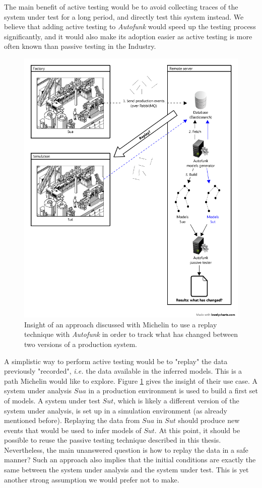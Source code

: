 The main benefit of active testing would be to avoid collecting
traces of the system under test for a long period, and directly
test this system instead. We believe that adding active testing
to \textit{Autofunk} would speed up the testing process
significantly, and it would also make its adoption easier as
active testing is more often known than passive testing in the
Industry.

\begin{figure}[ht]
    \begin{center}
        \includegraphics[width=0.8\linewidth]{figures/autofunk_active.png}
    \end{center}

    \caption{Insight of an approach discussed with Michelin to
    use a replay technique with \textit{Autofunk} in order to
    track what has changed between two versions of a production
    system.}
    \label{fig:autofunk_active}
\end{figure}

A simplistic way to perform active testing would be to "replay"
the data previously "recorded", \emph{i.e.} the data available in the
inferred models. This is a path Michelin would like to explore.
Figure \ref{fig:autofunk_active} gives the insight of their use
case. A system under analysis $\mathit{Sua}$ in a production environment
is used to build a first set of models. A system under test
$\mathit{Sut}$, which is likely a different version of the system under
analysis, is set up in a simulation environment (as already
mentioned before). Replaying the data from $\mathit{Sua}$ in $\mathit{Sut}$ should
produce new events that would be used to infer models of $\mathit{Sut}$.
At this point, it should be possible to reuse the passive testing
technique described in this thesis. Nevertheless, the main
unanswered question is how to replay the data in a safe manner?
Such an approach also implies that the initial conditions are
exactly the same between the system under analysis and the system
under test. This is yet another strong assumption we would prefer
not to make.

